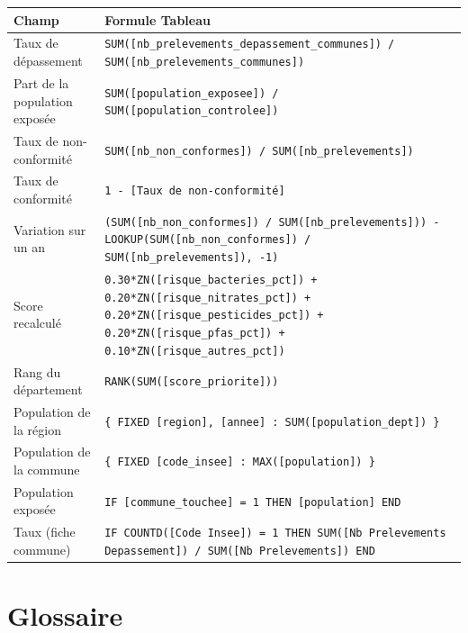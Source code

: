 \documentclass[11pt,a4paper]{article}
\begin{document}
\small
\begin{longtable}{>{\raggedright}p{4cm} >{\raggedright\arraybackslash}p{10cm}}
\toprule
Champ & Formule Tableau \\
\midrule
\endhead
Taux de dépassement & \texttt{SUM([nb\_prelevements\_depassement\_communes]) / SUM([nb\_prelevements\_communes])} \\
Part de la population exposée & \texttt{SUM([population\_exposee]) / SUM([population\_controlee])} \\
Taux de non-conformité & \texttt{SUM([nb\_non\_conformes]) / SUM([nb\_prelevements])} \\
Taux de conformité & \texttt{1 - [Taux de non-conformité]} \\
Variation sur un an & \texttt{(SUM([nb\_non\_conformes]) / SUM([nb\_prelevements])) - LOOKUP(SUM([nb\_non\_conformes]) / SUM([nb\_prelevements]), -1)} \\
Score recalculé & \texttt{0.30*ZN([risque\_bacteries\_pct]) + 0.20*ZN([risque\_nitrates\_pct]) + 0.20*ZN([risque\_pesticides\_pct]) + 0.20*ZN([risque\_pfas\_pct]) + 0.10*ZN([risque\_autres\_pct])} \\
Rang du département & \texttt{RANK(SUM([score\_priorite]))} \\
Population de la région & \texttt{\{ FIXED [region], [annee] : SUM([population\_dept]) \}} \\
Population de la commune & \texttt{\{ FIXED [code\_insee] : MAX([population]) \}} \\
Population exposée & \texttt{IF [commune\_touchee] = 1 THEN [population] END} \\
Taux (fiche commune) & \texttt{IF COUNTD([Code Insee]) = 1 THEN SUM([Nb Prelevements Depassement]) / SUM([Nb Prelevements]) END} \\
\bottomrule
\end{longtable}
\normalsize

\section{Glossaire}
\end{document}
